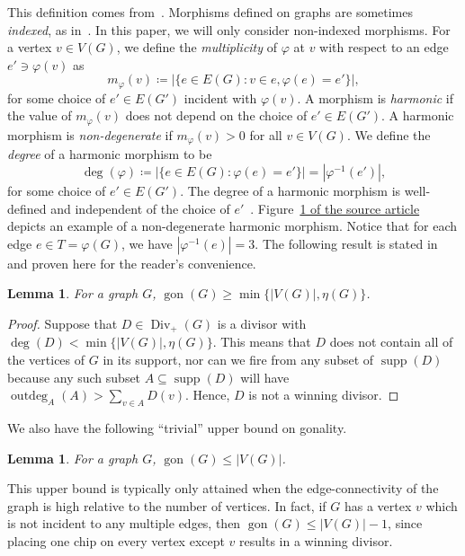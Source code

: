 \documentclass[10pt]{amsart}
\newtheorem{lemma}[theorem]{Lemma}
\DeclareMathOperator{\gon}{gon}
\DeclareMathOperator{\Div}{Div}
\DeclareMathOperator{\supp}{supp}
\DeclareMathOperator{\outdeg}{outdeg}
\begin{document}
This definition comes from~\cite{bn2}. Morphisms defined on graphs are sometimes \emph{indexed}, as in~\cite{liyau}. In this paper, we will only consider non-indexed morphisms. For a vertex $v \in V(G)$, we define the \emph{multiplicity} of $\varphi$ at $v$ with respect to an edge $e' \ni \varphi(v)$ as
\[
m_\varphi(v) \coloneqq | \{ e \in E(G) : v \in e, \varphi(e) = e' \} |,
\]
for some choice of $e' \in E(G')$ incident with $\varphi(v)$. A morphism is \emph{harmonic} if the value of $m_\varphi(v)$ does not depend on the choice of $e' \in E(G')$. A harmonic morphism is \emph{non-degenerate} if $m_\varphi(v) > 0$ for all $v \in V(G)$. We define the \emph{degree} of a harmonic morphism to be
\[
\deg (\varphi) \coloneqq | \{ e \in E(G) : \varphi(e) = e' \} | = |\varphi^{-1}(e')|,
\]
for some choice of $e' \in E(G')$. The degree of a harmonic morphism is well-defined and independent of the choice of $e'$~\cite[Lemma~2.4]{bn2}. Figure~\href{https://alco.centre-mersenne.org/item/10.5802/alco.80.pdf#page=7}{1 of the source article} depicts an example of a non-degenerate harmonic morphism. Notice that for each edge $e \in T = \varphi(G)$, we have $|\varphi^{-1}(e)| = 3$.
The following result is stated in~\cite{liyau} and proven here for the reader's convenience.

\begin{lemma}
\label{lemma:eta}
For a graph $G$, $\gon (G) \geq \min \{|V(G)|, \eta(G)\}$.
\end{lemma}

\begin{proof}
Suppose that $D \in \Div _+(G)$ is a divisor with $\deg (D) < \min \{ |V(G)|, \eta(G) \}$. This means that $D$ does not contain all of the vertices of $G$ in its support, nor can we fire from any subset of $\supp (D)$ because any such subset $A \subseteq \supp (D)$ will have $\outdeg _A(A) > \sum_{v \in A} D(v)$. Hence, $D$ is not a winning divisor.
\end{proof}
We also have the following ``trivial'' upper bound on gonality.

\begin{lemma}
\label{lemma:upperbound}
For a graph $G$, $\gon (G) \leq |V(G)|$.
\end{lemma}

This upper bound is typically only attained when the edge-connectivity of the graph is high relative to the number of vertices. In fact, if $G$ has a vertex $v$ which is not incident to any multiple edges, then $\gon (G) \leq |V(G)|-1$, since placing one chip on every vertex except $v$ results in a winning divisor.
\end{document}

